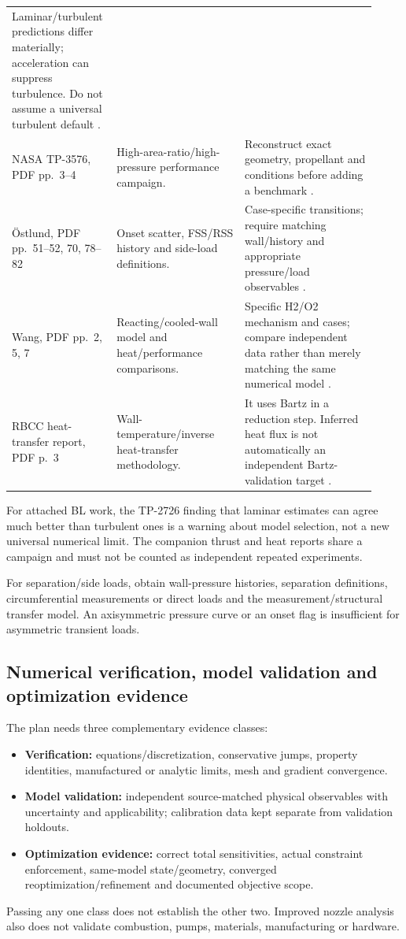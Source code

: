 \begin{longtable}{@{}P{0.23\linewidth}P{0.34\linewidth}P{0.35\linewidth}@{}}
Laminar/turbulent predictions differ materially; acceleration can
suppress turbulence. Do not assume a universal turbulent default
\cite{tp2726}.\\
NASA TP-3576, PDF pp.~3--4 &
High-area-ratio/high-pressure performance campaign. &
Reconstruct exact geometry, propellant and conditions before adding
a benchmark \cite{tp3576}.\\
\"Ostlund, PDF pp.~51--52, 70, 78--82 &
Onset scatter, FSS/RSS history and side-load definitions. &
Case-specific transitions; require matching wall/history and
appropriate pressure/load observables \cite{ostlund}.\\
Wang, PDF pp.~2, 5, 7 &
Reacting/cooled-wall model and heat/performance comparisons. &
Specific H2/O2 mechanism and cases; compare independent data rather
than merely matching the same numerical model \cite{wang}.\\
RBCC heat-transfer report, PDF p.~3 &
Wall-temperature/inverse heat-transfer methodology. &
It uses Bartz in a reduction step. Inferred heat flux is not automatically
an independent Bartz-validation target \cite{rbcc}.\\
\bottomrule
\end{longtable}

For attached BL work, the TP-2726 finding that laminar estimates can
agree much better than turbulent ones is a warning about model selection,
not a new universal numerical limit. The companion thrust and heat
reports share a campaign and must not be counted as independent repeated
experiments.

For separation/side loads, obtain wall-pressure histories, separation
definitions, circumferential measurements or direct loads and the
measurement/structural transfer model. An axisymmetric pressure curve
or an onset flag is insufficient for asymmetric transient loads.

\subsection{Numerical verification, model validation and optimization evidence}
The plan needs three complementary evidence classes:
\begin{itemize}
\item \textbf{Verification:} equations/discretization, conservative
jumps, property identities, manufactured or analytic limits, mesh and
gradient convergence.
\item \textbf{Model validation:} independent source-matched physical
observables with uncertainty and applicability; calibration data kept
separate from validation holdouts.
\item \textbf{Optimization evidence:} correct total sensitivities,
actual constraint enforcement, same-model state/geometry, converged
reoptimization/refinement and documented objective scope.
\end{itemize}
Passing any one class does not establish the other two. Improved nozzle
analysis also does not validate combustion, pumps, materials, manufacturing
or hardware.

